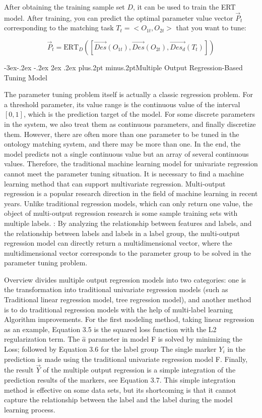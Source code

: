 \documentclass[twoside]{article}
\makeatletter
\def\subsection{\@startsection{subsection}{2}{\z@}%
 {-3ex\@plus -.2ex \@minus -.2ex}%
 {2ex \@plus.2ex}%
{\normalfont\normalsize\protect\baselineskip=12.5pt plus.2pt minus.2pt\bfseries}}
\makeatother
\begin{document}
After obtaining the training sample set $D$, it can be used to train the ERT model.
After training, you can predict the optimal parameter value vector $\vec{P}_t$ corresponding to the matching task $T_t=<O_{1t},O_{2t}>$ that you want to tune:

\begin{equation}
\vec{P}_t = \text{ERT}_D([\vec{Des}(O_{1t}), \vec{Des}(O_{2t}), \vec{Des_d}(T_t)])
\end{equation}

\subsection{Multiple Output Regression-Based Tuning Model}

The parameter tuning problem itself is actually a classic regression problem.
For a threshold parameter, its value range is the continuous value of the interval $[0,1]$, which is the prediction target of the model.
For some discrete parameters in the system, we also treat them as continuous parameters, and finally discretize them.
However, there are often more than one parameter to be tuned in the ontology matching system, and there may be more than one. In the end, the model predicts not a single continuous value but an array of several continuous values.
Therefore, the traditional machine learning model for univariate regression cannot meet the parameter tuning situation. It is necessary to find a machine learning method that can support multivariate regression.
Multi-output regression \cite{tyz74} is a popular research direction in the field of machine learning in recent years. Unlike traditional regression models, which can only return one value, the object of multi-output regression research is some sample training sets with multiple labels. : By analyzing the relationship between features and labels, and the relationship between labels and labels in a label group, the multi-output regression model can directly return a multidimensional vector, where the multidimensional vector corresponds to the parameter group to be solved in the parameter tuning problem.

Overview \cite{tyz74} divides multiple output regression models into two categories: one is the transformation into traditional univariate regression models (such as
Traditional linear regression model, tree regression model), and another method is to do traditional regression models with the help of multi-label learning
Algorithm improvements.
For the first modeling method, taking linear regression as an example, Equation 3.5 is the squared loss function with the L2 regularization term. The $\hat{a}$ parameter in model F is solved by minimizing the Loss; followed by Equation 3.6 for the label group The single marker $Y_{i}$ in the prediction is made using the traditional univariate regression model F. Finally, the result $\vec{Y}$ of the multiple output regression is a simple integration of the prediction results of the markers, see Equation 3.7.
This simple integration method is effective on some data sets, but its shortcoming is that it cannot capture the relationship between the label and the label during the model learning process.
\end{document}
